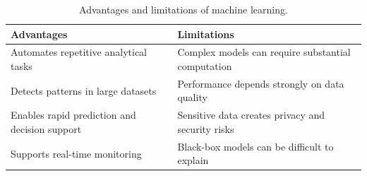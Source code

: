 \begin{table}[!b]
\centering
\caption{Advantages and limitations of machine learning.}
\scriptsize
    \setlength{\tabcolsep}{4pt}
    \renewcommand{\arraystretch}{1.25}
    \begin{tabular}{@{}>{\RaggedRight\arraybackslash}p{}
                        >{\RaggedRight\arraybackslash}p{}@{}}
      \toprule
      \textbf{Advantages} & \textbf{Limitations} \\
      \midrule
      Automates repetitive analytical tasks & Complex models can require substantial computation \\
      Detects patterns in large datasets & Performance depends strongly on data quality \\
      Enables rapid prediction and decision support & Sensitive data creates privacy and security risks \\
      Supports real-time monitoring & Black-box models can be difficult to explain \\
      \bottomrule
    \end{tabular}
\end{table}

